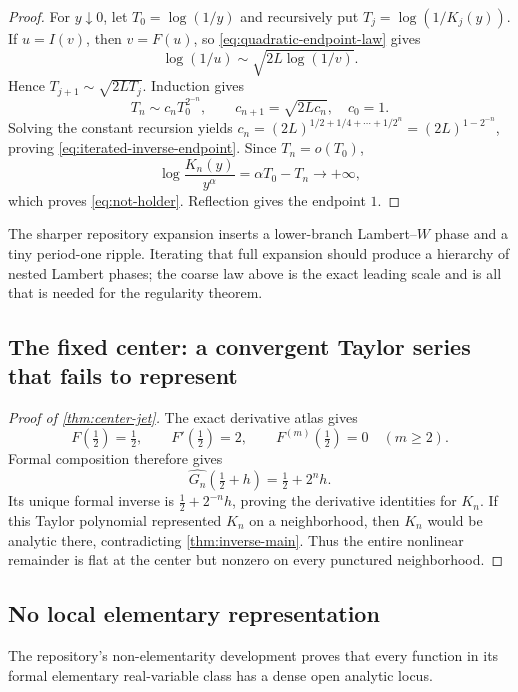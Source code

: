 \documentclass[11pt,oneside]{article}
\theoremstyle{definition}
\theoremstyle{remark}
\newcommand{\half}{\tfrac12}
\newcommand{\FormalTaylorGerm}[1]{\widehat{#1}}
\begin{document}
\begin{proof}
For $y\downarrow0$, let $T_0=\log(1/y)$ and recursively put
$T_j=\log(1/K_j(y))$.  If $u=I(v)$, then $v=F(u)$, so
\eqref{eq:quadratic-endpoint-law} gives
\begin{equation}
 \log(1/u)\sim\sqrt{2L\log(1/v)}.
 \label{eq:one-inverse-log}
\end{equation}
Hence $T_{j+1}\sim\sqrt{2LT_j}$.  Induction gives
\[
 T_n\sim c_n T_0^{2^{-n}},
 \qquad c_{n+1}=\sqrt{2Lc_n},\quad c_0=1.
\]
Solving the constant recursion yields
$c_n=(2L)^{1/2+1/4+\cdots+1/2^n}=(2L)^{1-2^{-n}}$, proving
\eqref{eq:iterated-inverse-endpoint}.  Since $T_n=o(T_0)$,
\[
 \log\frac{K_n(y)}{y^\alpha}=\alpha T_0-T_n\longrightarrow+\infty,
\]
which proves \eqref{eq:not-holder}.  Reflection gives the endpoint $1$.
\end{proof}

The sharper repository expansion inserts a lower-branch Lambert--$W$ phase and a tiny
period-one ripple.  Iterating that full expansion should produce a hierarchy of nested
Lambert phases; the coarse law above is the exact leading scale and is all that is
needed for the regularity theorem.

\subsection{The fixed center: a convergent Taylor series that fails to represent}

\begin{proof}[Proof of \cref{thm:center-jet}]
The exact derivative atlas gives
\[
 F(\half)=\half,\qquad F'(\half)=2,
 \qquad F^{(m)}(\half)=0\quad(m\geq2).
\]
Formal composition therefore gives
\[
 \FormalTaylorGerm{G_n}(\half+h)=\half+2^nh.
\]
Its unique formal inverse is $\half+2^{-n}h$, proving the derivative identities for
$K_n$.  If this Taylor polynomial represented $K_n$ on a neighborhood, then $K_n$
would be analytic there, contradicting \cref{thm:inverse-main}.  Thus the entire
nonlinear remainder is flat at the center but nonzero on every punctured neighborhood.
\end{proof}

\subsection{No local elementary representation}

The repository's non-elementarity development proves that every function in its
formal elementary real-variable class has a dense open analytic locus.
\end{document}

